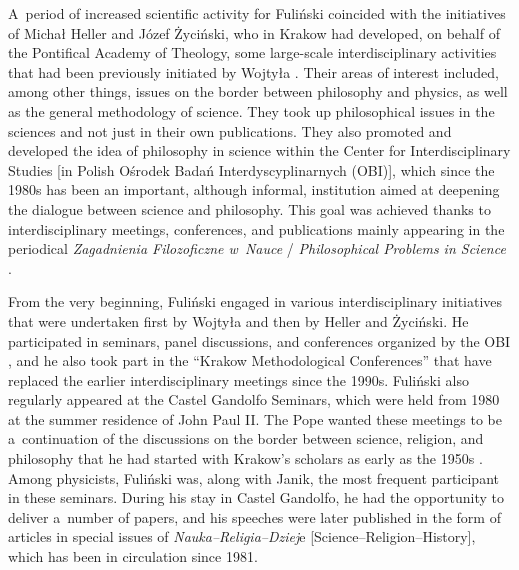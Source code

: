 A~period of increased scientific activity for Fuliński coincided with the initiatives of Michał Heller and Józef Życiński, who in Krakow had developed, on behalf of the Pontifical Academy of Theology, some large-scale interdisciplinary activities that had been previously initiated by Wojtyła 
\parencite[][]{trombik_stworzyc_2022}. %
 Their areas of interest included, among other things, issues on the border between philosophy and physics, as well as the general methodology of science. They took up philosophical issues in the sciences and not just in their own publications. They also promoted and developed the idea of philosophy in science within the Center for Interdisciplinary Studies [in Polish Ośrodek Badań Interdyscyplinarnych (OBI)], which since the 1980s has been an important, although informal, institution aimed at deepening the dialogue between science and philosophy. This goal was achieved thanks to interdisciplinary meetings, conferences, and publications mainly appearing in the periodical \textit{Zagadnienia Filozoficzne w~Nauce} / \textit{Philosophical Problems in Science} 
\parencites[][]{heller_poczatki_2006}[][]{polak_philosophy_2019}[][]{trombik_origin_2019}.%




From the very beginning, Fuliński engaged in various interdisciplinary initiatives that were undertaken first by Wojtyła and then by Heller and Życiński. He participated in seminars, panel discussions, and conferences organized by the OBI 
\parencite[][]{liana_z_1999}, %
 and he also took part in the ``Krakow Methodological Conferences'' that have replaced the earlier interdisciplinary meetings since the 1990s. Fuliński also regularly appeared at the Castel Gandolfo Seminars, which were held from 1980 at the summer residence of John Paul II. The Pope wanted these meetings to be a~continuation of the discussions on the border between science, religion, and philosophy that he had started with Krakow's scholars as early as the 1950s 
\parencites[][p.5]{janik_nauka_1981}[][]{nowina_konopka_kontakty_2020}. %
 Among physicists, Fuliński was, along with Janik, the most frequent participant in these seminars. During his stay in Castel Gandolfo, he had the opportunity to deliver a~number of papers, and his speeches were later published in the form of articles in special issues of \textit{Nauka–Religia–Dziej}e [Science–Religion–History], which has been in circulation since 1981.



